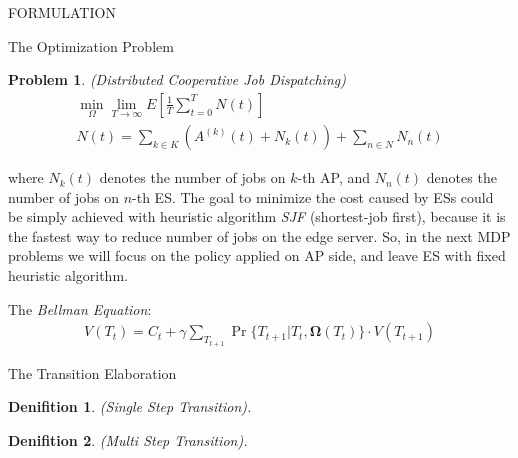 \documentclass[10pt, conference, letterpaper]{IEEEtran}
\newtheorem{definition}{Denifition}
\newtheorem{problem}{Problem}
\renewcommand{\vec}{\mathbf}
\begin{document}
\begin{section}{FORMULATION}
\begin{subsection}{The Optimization Problem}
            \begin{problem}
                (Distributed Cooperative Job Dispatching)
                \begin{gather}
                    \min_{\Omega} \lim_{T \to \infty} E[\frac{1}{T} \sum_{t=0}^{T} N(t)]
                    \nonumber\\
                    N(t) = \sum_{k \in K} (A^{(k)}(t) + N_k(t))
                            + \sum_{n \in N} N_n(t)
                \end{gather}
            \end{problem}
            where $N_k(t)$ denotes the number of jobs on $k$-th AP, and $N_n(t)$ denotes the number of jobs on $n$-th ES.
            The goal to minimize the cost caused by ESs could be simply achieved with heuristic algorithm \emph{SJF} (shortest-job first), because it is the fastest way to reduce number of jobs on the edge server. So, in the next MDP problems we will focus on the policy applied on AP side, and leave ES with fixed heuristic algorithm.

            The \emph{Bellman Equation}:
            \begin{align}
                V(T_{t}) = C_t + \gamma \sum_{T_{t+1}} \Pr\{T_{t+1}|T_{t}, \vec{\Omega}(T_t)\} \cdot V(T_{t+1})
            \end{align}
        \end{subsection}

        \begin{subsection}{The Transition Elaboration}
            \begin{definition}
                (Single Step Transition).

            \end{definition}

            \begin{definition}
                (Multi Step Transition).
            \end{definition}
        \end{subsection}
        
    \end{section}
\end{document}
